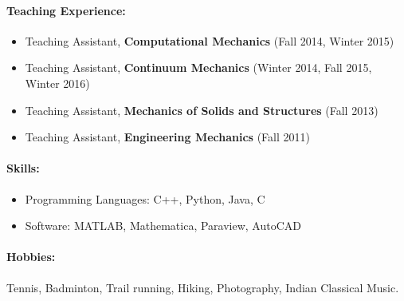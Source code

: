 \documentclass[10pt,fleqn]{article}
\begin{document}
\paragraph*{Teaching Experience:}
\vspace{-10pt}
\begin{itemize}
\setlength{\itemsep}{0pt}
\setlength{\parskip}{0pt}
\item Teaching Assistant, \textbf{Computational Mechanics} (Fall 2014, Winter 2015)
\item Teaching Assistant, \textbf{Continuum Mechanics} (Winter 2014, Fall 2015, Winter 2016)
\item Teaching Assistant, \textbf{Mechanics of Solids and Structures} (Fall 2013)
\item Teaching Assistant, \textbf{Engineering Mechanics} (Fall 2011)
\end{itemize}
\vspace{-10pt}
\paragraph*{Skills:}
\vspace{-10pt}
\begin{itemize}
\setlength{\itemsep}{0pt}
\setlength{\parskip}{0pt}
\item Programming Languages: C++, Python, Java, C
\item Software: MATLAB, Mathematica, Paraview, AutoCAD
\end{itemize}
\vspace{-10pt}
\paragraph*{Hobbies:} Tennis, Badminton, Trail running, Hiking, Photography, Indian Classical Music.
\vspace{-10pt}
\end{document}
